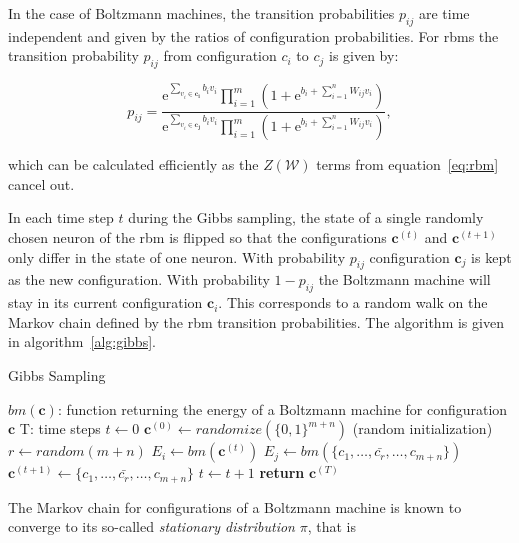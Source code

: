 In the case of Boltzmann machines, the transition probabilities $p_{ij}$ are time independent and 
given by the ratios of configuration probabilities. For \gls{rbm}s the transition probability $p_{ij}$ 
from configuration $c_i$ to $c_j$ is given by:

\begin{equation}
    p_{ij} = \frac{\mathrm{e}^{\sum_{v_i \in \bm{c_i}}b_iv_i}\prod_{i=1}^m(1+\mathrm{e}^{b_i + \sum_{i=1}^nW_{ij}v_i})}{\mathrm{e}^{\sum_{v_i \in \bm{c_j}}b_iv_i}\prod_{i=1}^m(1+\mathrm{e}^{b_i + \sum_{i=1}^nW_{ij}v_i})},
\end{equation}

which can be calculated efficiently as the $Z(\mathcal{W})$ terms from equation~\ref{eq:rbm} cancel out.

In each time step $t$ during the Gibbs sampling, the state of a single randomly chosen neuron of the \gls{rbm} is flipped
so that the configurations $\bm{c}^{(t)}$ and $\bm{c}^{(t+1)}$ only differ in the state of one neuron. With 
probability $p_{ij}$ configuration $\bm{c}_j$ is kept as the new configuration. With probability
$1-p_{ij}$ the Boltzmann machine will stay in its current configuration $\bm{c}_i$. This corresponds to a random walk on the Markov chain defined by the \gls{rbm} transition probabilities. The algorithm is given in 
algorithm~\ref{alg:gibbs}.

\begin{algorithm}[H]
    \caption{Gibbs Sampling}
    \begin{algorithmic}[1]
        \Require $bm(\bm{c})$: function returning the energy of a Boltzmann machine for configuration $\bm{c}$
        \Require T: time steps
        \State $t\gets 0$
        \State $\bm{c}^{(0)} \gets randomize(\{0,1\}^{m+n})$ (random initialization)
        \Repeat
            \State $r \gets random(m+n)$
            \State $E_i \gets bm(\bm{c}^{(t)})$
            \State $E_j \gets bm(\{c_1,\dots,\bar{c_r},\dots,c_{m+n}\})$
                \State $\bm{c}^{(t+1)} \gets \{c_1,\dots,\bar{c_r},\dots,c_{m+n}\}$
            \EndIf
            \State $t\gets t+1$
        \State \textbf{return} $\bm{c}^{(T)}$
    \end{algorithmic}
    \label{alg:gibbs}
\end{algorithm}

The Markov chain for configurations of a Boltzmann machine is known to converge to its so-called 
\textit{stationary distribution} $\pi$, that is

